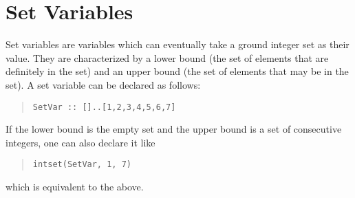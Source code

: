 \section{Set Variables}

Set variables are variables which can eventually take a ground integer
set as their value.  They are characterized by a lower bound (the set
of elements that are definitely in the set) and an upper bound (the
set of elements that may be in the set).  A set variable can be
declared as follows: 
\begin{quote}\begin{verbatim}
SetVar :: []..[1,2,3,4,5,6,7]
\end{verbatim}\end{quote}
If the lower bound is the empty set and the upper bound is a set of
consecutive integers, one can also declare it like
\begin{quote}\begin{verbatim}
intset(SetVar, 1, 7)
\end{verbatim}\end{quote}
which is equivalent to the above.    

